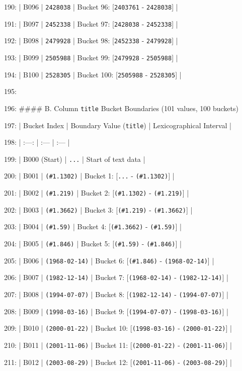 \documentclass[11pt,a4paper]{article}
\begin{document}
190: | B096 | \texttt{2428038} | Bucket 96: [\texttt{2403761} - \texttt{2428038}] |

191: | B097 | \texttt{2452338} | Bucket 97: [\texttt{2428038} - \texttt{2452338}] |

192: | B098 | \texttt{2479928} | Bucket 98: [\texttt{2452338} - \texttt{2479928}] |

193: | B099 | \texttt{2505988} | Bucket 99: [\texttt{2479928} - \texttt{2505988}] |

194: | B100 | \texttt{2528305} | Bucket 100: [\texttt{2505988} - \texttt{2528305}] |

195:

196: \#\#\#\# B. Column \texttt{title} Bucket Boundaries (101 values, 100 buckets)

197: | Bucket Index | Boundary Value (\texttt{title}) | Lexicographical Interval |

198: | :---: | :--- | :--- |

199: | B000 (Start) | \texttt{...} | Start of text data |

200: | B001 | \texttt{(\#1.1302)} | Bucket 1: [\texttt{...} - \texttt{(\#1.1302)}] |

201: | B002 | \texttt{(\#1.219)} | Bucket 2: [\texttt{(\#1.1302)} - \texttt{(\#1.219)}] |

202: | B003 | \texttt{(\#1.3662)} | Bucket 3: [\texttt{(\#1.219)} - \texttt{(\#1.3662)}] |

203: | B004 | \texttt{(\#1.59)} | Bucket 4: [\texttt{(\#1.3662)} - \texttt{(\#1.59)}] |

204: | B005 | \texttt{(\#1.846)} | Bucket 5: [\texttt{(\#1.59)} - \texttt{(\#1.846)}] |

205: | B006 | \texttt{(1968-02-14)} | Bucket 6: [\texttt{(\#1.846)} - \texttt{(1968-02-14)}] |

206: | B007 | \texttt{(1982-12-14)} | Bucket 7: [\texttt{(1968-02-14)} - \texttt{(1982-12-14)}] |

207: | B008 | \texttt{(1994-07-07)} | Bucket 8: [\texttt{(1982-12-14)} - \texttt{(1994-07-07)}] |

208: | B009 | \texttt{(1998-03-16)} | Bucket 9: [\texttt{(1994-07-07)} - \texttt{(1998-03-16)}] |

209: | B010 | \texttt{(2000-01-22)} | Bucket 10: [\texttt{(1998-03-16)} - \texttt{(2000-01-22)}] |

210: | B011 | \texttt{(2001-11-06)} | Bucket 11: [\texttt{(2000-01-22)} - \texttt{(2001-11-06)}] |

211: | B012 | \texttt{(2003-08-29)} | Bucket 12: [\texttt{(2001-11-06)} - \texttt{(2003-08-29)}] |
\end{document}
